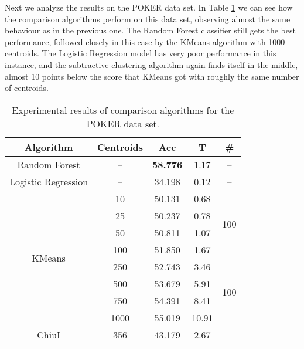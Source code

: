 Next we analyze the results on the POKER data set. In Table \ref{tab:poker1} we can see how the comparison algorithms perform on this data set, observing almost the same behaviour as in the previous one. The Random Forest classifier still gets the best performance, followed closely in this case by the KMeans algorithm with 1000 centroids. The Logistic Regression model has very poor performance in this instance, and the subtractive clustering algorithm again finds itself in the middle, almost 10 points below the score that KMeans got with roughly the same number of centroids.

\begin{table}[h!]
\centering
\caption{Experimental results of comparison algorithms for the POKER data set.}
\label{tab:poker1}
\begin{tabular}{ccccc}
\toprule
Algorithm      & Centroids & Acc     & T & \#          \\ \midrule
Random Forest                     & --                   & \textbf{58.776}                    & 1.17       & --                    \\
Logistic Regression                   & --                   & 34.198                   & 0.12       & --                    \\
\multirow{8}{*}{KMeans} & 10                  & 50.131   & 0.68       & \multirow{4}{*}{100} \\
                        & 25                  & 50.237        & 0.78       &                      \\
                        & 50                  & 50.811                      & 1.07       &                      \\
                        & 100                 & 51.850                       & 1.67       &                      \\
                        & 250                 & 52.743                          & 3.46       &          \multirow{4}{*}{100}            \\
                        & 500                 & 53.679                      & 5.91       &                      \\
                        & 750                 & 54.391                         & 8.41       &                      \\
                        & 1000                & 55.019                 & 10.91      &                      \\
ChiuI                   & 356                 & 43.179                       & 2.67       & --                    \\ \bottomrule
\end{tabular}
\end{table}


